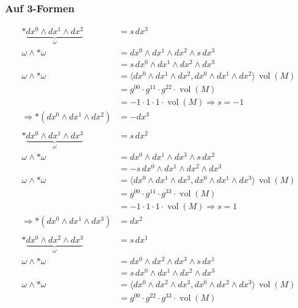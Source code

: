 \subsubsection{Auf 3-Formen}
\begin{align*}
	\ast \underbrace{dx^0 \wedge dx^1 \wedge dx^2}_{\omega}
	&=
	s \, dx^3
	\\
	\omega \wedge \ast \omega 
	&=
	dx^0 \wedge dx^1 \wedge dx^2 \wedge s \, dx^3
	\\
	&=
	s \, dx^0 \wedge dx^1 \wedge dx^2 \wedge dx^3
	\\
	\omega \wedge \ast \omega
	&=
	\langle dx^0 \wedge dx^1 \wedge dx^2 , dx^0 \wedge dx^1 \wedge dx^2 \rangle \, \operatorname{vol}(M)
	\\
	&=
	g^{00} \cdot g^{11} \cdot g^{22} \cdot \operatorname{vol}(M)
	\\
	&=
	-1 \cdot 1 \cdot 1 \cdot \operatorname{vol}(M) \Rightarrow s = -1
	\\
	\Rightarrow \ast (dx^0 \wedge dx^1 \wedge dx^2) 
	&= - dx^3
\\
\\
	\ast \underbrace{dx^0 \wedge dx^1 \wedge dx^3}_{\omega}
	&=
	s \, dx^2
	\\
	\omega \wedge \ast \omega 
	&=
	dx^0 \wedge dx^1 \wedge dx^3 \wedge s \, dx^2
	\\
	&=
	-s \, dx^0 \wedge dx^1 \wedge dx^2 \wedge dx^3
	\\
	\omega \wedge \ast \omega
	&=
	\langle dx^0 \wedge dx^1 \wedge dx^3 , dx^0 \wedge dx^1 \wedge dx^3 \rangle \, \operatorname{vol}(M)
	\\
	&=
	g^{00} \cdot g^{11} \cdot g^{33} \cdot \operatorname{vol}(M)
	\\
	&=
	-1 \cdot 1 \cdot 1 \cdot \operatorname{vol}(M) \Rightarrow s = 1
	\\
	\Rightarrow \ast (dx^0 \wedge dx^1 \wedge dx^3) 
	&= dx^2
\\
\\
	\ast \underbrace{dx^0 \wedge dx^2 \wedge dx^3}_{\omega}
	&=
	s \, dx^1
	\\
	\omega \wedge \ast \omega 
	&=
	dx^0 \wedge dx^2 \wedge dx^3 \wedge s \, dx^1
	\\
	&=
	s \, dx^0 \wedge dx^1 \wedge dx^2 \wedge dx^3
	\\
	\omega \wedge \ast \omega
	&=
	\langle dx^0 \wedge dx^2 \wedge dx^3 , dx^0 \wedge dx^2 \wedge dx^3 \rangle \, \operatorname{vol}(M)
	\\
	&=
	g^{00} \cdot g^{22} \cdot g^{33} \cdot \operatorname{vol}(M)
	\\

\end{align*}
